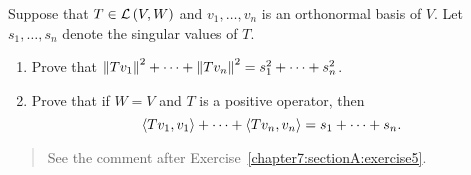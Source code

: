 \begin{exercise}\label{chapter7:sectionE:exercise11}
    Suppose that $T\in\mathcal{L}\left({V, W}\right)$ and $v_{1}, \ldots, v_{n}$ is an orthonormal basis of $V$. Let $s_{1}, \ldots, s_{n}$ denote the singular values of $T$.
    \begin{enumerate}[label={(\alph*)}]
        \item Prove that $\left\Vert{Tv_{1}}\right\Vert^{2} + \cdots + \left\Vert{Tv_{n}}\right\Vert^{2} = s_{1}^{2} + \cdots + s_{n}^{2}$.
        \item Prove that if $W = V$ and $T$ is a positive operator, then
              \[
                  \left\langle{Tv_{1}, v_{1}}\right\rangle + \cdots + \left\langle{Tv_{n}, v_{n}}\right\rangle = s_{1} + \cdots + s_{n}.
              \]
    \end{enumerate}
\end{exercise}

\begin{quote}
    See the comment after Exercise~\ref{chapter7:sectionA:exercise5}.
\end{quote}

